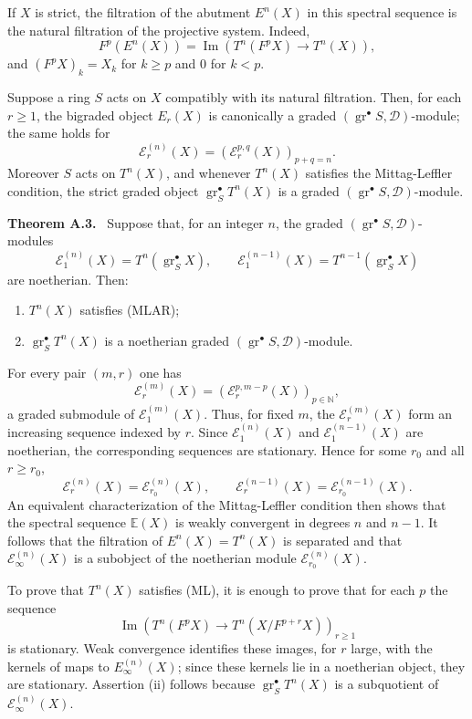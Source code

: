 \documentclass[11pt]{article}
\theoremstyle{plain}
\theoremstyle{definition}
\theoremstyle{remark}
\newenvironment{statement}[1]{\par\medskip\noindent\textbf{#1.}\ }{\par\medskip}
\newcommand{\bN}{\mathbb N}
\newcommand{\cD}{\mathcal D}\newcommand{\cE}{\mathcal E}\newcommand{\cF}{\mathcal F}
\DeclareMathOperator{\Imn}{Im}
\DeclareMathOperator{\gr}{gr}
\begin{document}
If $X$ is strict, the filtration of the abutment $E^n(X)$ in this spectral sequence
is the natural filtration of the projective system. Indeed,
\[
 F^p(E^n(X))=\Imn(T^n(F^pX)\to T^n(X)),
\]
and $(F^pX)_k=X_k$ for $k\ge p$ and $0$ for $k<p$.

Suppose a ring $S$ acts on $X$ compatibly with its natural filtration. Then, for each
$r\ge1$, the bigraded object $E_r(X)$ is canonically a graded
$(\gr^\bullet S,\cD)$-module; the same holds for
\[
       \cE_r^{(n)}(X)=(\cE_r^{p,q}(X))_{p+q=n}.
\]
Moreover $S$ acts on $T^n(X)$, and whenever $T^n(X)$ satisfies the Mittag-Leffler
condition, the strict graded object $\gr_S^\bullet T^n(X)$ is a graded
$(\gr^\bullet S,\cD)$-module.

\begin{statement}{Theorem A.3}
Suppose that, for an integer $n$, the graded $(\gr^\bullet S,\cD)$-modules
\[
      \cE_1^{(n)}(X)=T^n(\gr_S^\bullet X),
      \qquad
      \cE_1^{(n-1)}(X)=T^{n-1}(\gr_S^\bullet X)
\]
are noetherian. Then:
\begin{enumerate}[label=(\roman*)]
\item $T^n(X)$ satisfies (MLAR);
\item $\gr_S^\bullet T^n(X)$ is a noetherian graded
$(\gr^\bullet S,\cD)$-module.
\end{enumerate}
\end{statement}

For every pair $(m,r)$ one has
\[
      \cE_r^{(m)}(X)=(\cE_r^{p,m-p}(X))_{p\in\bN},
\]
a graded submodule of $\cE_1^{(m)}(X)$. Thus, for fixed $m$, the
$\cE_r^{(m)}(X)$ form an increasing sequence indexed by $r$. Since
$\cE_1^{(n)}(X)$ and $\cE_1^{(n-1)}(X)$ are noetherian, the corresponding sequences
are stationary. Hence for some $r_0$ and all $r\ge r_0$,
\[
 \cE_r^{(n)}(X)=\cE_{r_0}^{(n)}(X),
 \qquad
 \cE_r^{(n-1)}(X)=\cE_{r_0}^{(n-1)}(X).
\]
An equivalent characterization of the Mittag-Leffler condition then shows that the
spectral sequence $\mathbb E(X)$ is weakly convergent in degrees $n$ and $n-1$. It
follows that the filtration of $E^n(X)=T^n(X)$ is separated and that
$\cE_\infty^{(n)}(X)$ is a subobject of the noetherian module
$\cE_{r_0}^{(n)}(X)$.

To prove that $T^n(X)$ satisfies (ML), it is enough to prove that for each $p$ the
sequence
\[
\Imn(T^n(F^pX)\to T^n(X/F^{p+r}X))_{r\ge1}
\]
is stationary. Weak convergence identifies these images, for $r$ large, with the
kernels of maps to $E_\infty^{(n)}(X)$; since these kernels lie in a noetherian
object, they are stationary. Assertion (ii) follows because
$\gr_S^\bullet T^n(X)$ is a subquotient of $\cE_\infty^{(n)}(X)$.
\end{document}
